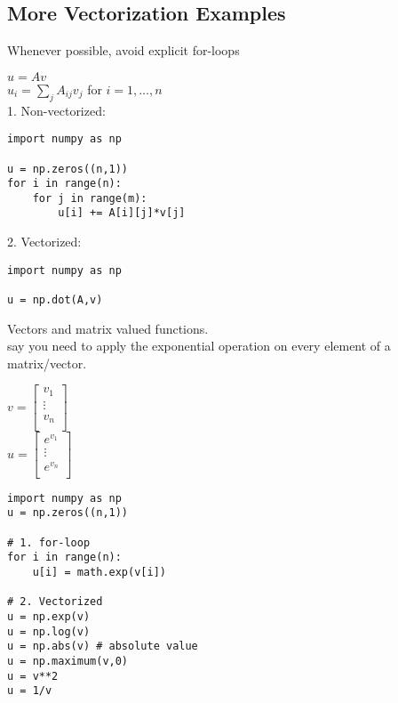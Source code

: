 \documentclass{article}
\begin{document}
\newpage
\subsection{More Vectorization Examples}

Whenever possible, avoid explicit for-loops

$u = Av$\\
$u_i = \sum_{j}A_{ij}v_j$ for $i=1, \dots, n$\\

1. Non-vectorized:\\

\lstset{language=Python}
\begin{lstlisting}
import numpy as np

u = np.zeros((n,1))
for i in range(n):
    for j in range(m):
        u[i] += A[i][j]*v[j]
\end{lstlisting}

2. Vectorized:\\

\lstset{language=Python}
\begin{lstlisting}
import numpy as np

u = np.dot(A,v)
\end{lstlisting}

Vectors and matrix valued functions.\\
    say you need to apply the exponential operation on every element of a matrix/vector.

$v =
\begin{bmatrix}
v_1\\
\vdots\\
v_n\\
\end{bmatrix}
$\\

$u =
\begin{bmatrix}
e^{v_1}\\
\vdots\\
e^{v_n}\\
\end{bmatrix}
$\\

\lstset{language=Python}
\begin{lstlisting}
import numpy as np
u = np.zeros((n,1))

# 1. for-loop
for i in range(n):
    u[i] = math.exp(v[i])

# 2. Vectorized
u = np.exp(v)
u = np.log(v)
u = np.abs(v) # absolute value
u = np.maximum(v,0)
u = v**2
u = 1/v

\end{lstlisting}
\end{document}
